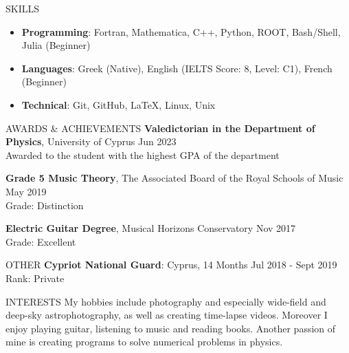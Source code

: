 \documentclass{resume} %
\begin{document}
        \bigbreak

        \begin{rSection}{SKILLS}
                \begin{itemize}
                        \itemsep -3pt {} 
                        \item \textbf{Programming}: Fortran, Mathematica, C++, Python, ROOT, Bash/Shell, Julia (Beginner)
                        \item \textbf{Languages}: Greek (Native), English (IELTS Score: 8, Level: C1), French (Beginner)
                        \item \textbf{Technical}: Git, GitHub, \LaTeX, Linux, Unix
                \end{itemize}
        \end{rSection}

        \bigbreak

        \begin{rSection}{AWARDS \& ACHIEVEMENTS}
                {\bf Valedictorian in the Department of Physics}, University of Cyprus \hfill Jun 2023\\
                Awarded to the student with the highest GPA of the department
                
                {\bf Grade 5 Music Theory}, The Associated Board of the Royal Schools of Music \hfill May 2019\\
                Grade: Distinction
                
                {\bf Electric Guitar Degree}, Musical Horizons Conservatory \hfill Nov 2017\\
                Grade: Excellent
        \end{rSection} 

        \bigbreak

        \begin{rSection}{OTHER}
                {\bf Cypriot National Guard}: Cyprus, 14 Months \hfill {Jul 2018 - Sept 2019}\\
                Rank: Private
        \end{rSection}

        \bigbreak

        \begin{rSection}{INTERESTS} 
                My hobbies include photography and especially wide-field and deep-sky astrophotography, as well as creating time-lapse videos.
                Moreover I enjoy playing guitar, listening to music and reading books.
                Another passion of mine is creating programs to solve numerical problems in physics.
        \end{rSection}
\end{document}
